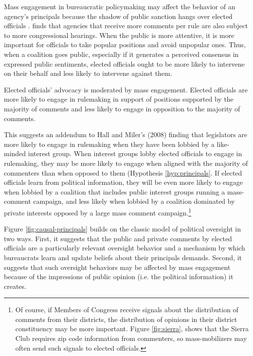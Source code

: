 Mass engagement in bureaucratic policymaking may affect the behavior of an agency's principals because the shadow of public sanction hangs over elected officials \citep{Arnold1979, Mayhew2000}. \citet{Moore2018} finds that agencies that receive more comments per rule are also subject to more congressional hearings. When the public is more attentive, it is more important for officials to take popular positions and avoid unpopular ones.
Thus, when a coalition goes public, especially if it generates a perceived consensus in expressed public sentiments, elected officials ought to be more likely to intervene on their behalf and less likely to intervene against them.  

\begin{hyp} \label{hyp:principals}
Elected officials' advocacy is moderated by mass engagement. Elected officials are more likely to engage in rulemaking in support of positions supported by the majority of comments and less likely to engage in opposition to the majority of comments.
\end{hyp}

This suggests an addendum to Hall and Miler's (2008) finding that legislators are more likely to engage in rulemaking when they have been lobbied by a like-minded interest group.
When interest groups lobby elected officials to engage in rulemaking, they may be more likely to engage when aligned with the majority of commenters than when opposed to them (Hypothesis \ref{hyp:principals}.
If elected officials learn from political information, they will be even more likely to engage when lobbied by a coalition that includes public interest groups running a mass-comment campaign, and less likely when lobbied by a coalition dominated by private interests opposed by a large mass comment campaign.\footnote{Of course, if Members of Congress receive signals about the distribution of comments from their districts, the distribution of opinions in their district constituency may be more important. Figure \ref{fig:sierra}, shows that the Sierra Club requires zip code information from commenters, so mass-mobilizers may often send such signals to elected officials.}



Figure \ref{fig:causal-principals} builds on the classic model of political oversight in two ways. First, it suggests that the public and private comments by elected officials are a particularly relevant oversight behavior and a mechanism by which bureaucrats learn and update beliefs about their principals demands. Second, it suggests that such oversight behaviors may be affected by mass engagement because of the impressions of public opinion (i.e. the political information) it creates.